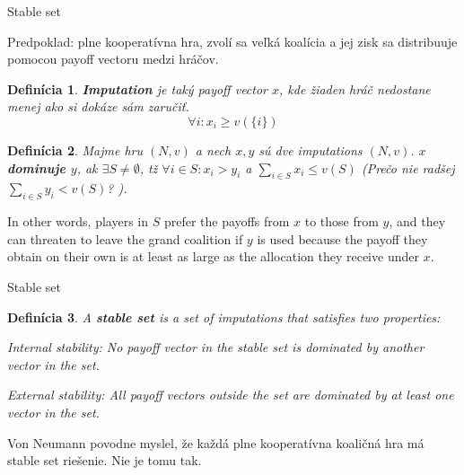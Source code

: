 \documentclass{beamer}
\newtheorem*{mydef}{Defin\'icia}
\begin{document}
\begin{frame}{Stable set}

Predpoklad: plne kooperat\'ivna hra, zvol\'i sa ve\v{l}k\'a koal\'icia a jej zisk sa distribuuje pomocou payoff vectoru medzi hr\'a\v{c}ov.
 
\begin{mydef}
{\bf Imputation} je tak\'y payoff vector $x$, kde \v{z}iaden hr\'a\v{c} nedostane menej ako si dok\'aze s\'am zaru\v{c}i\v{t}. 
\[ \forall i:x_{i} \geq v(\{i\})\]
\end{mydef}


\begin{mydef}
Majme hru $(N,v)$ a nech $x,y$ s\'u dve imputations $(N,v)$. {\bf $x$ dominuje $y$}, ak $\exists S \neq \emptyset$, t\v{z} $\forall i \in S :x_{i} > y_{i}$ a $\sum_{i \in S} x_{i} \leq v(S)$ (Pre\v{c}o nie rad\v{s}ej  $\sum_{i \in S} y_{i} < v(S)$? ).	
\end{mydef}

 In other words, players in $S$ prefer the payoffs from $x$ to those from $y$, and they can threaten to leave the grand coalition if $y$ is used because the payoff they obtain on their own is at least as large as the allocation they receive under $x$. 

\end{frame}



\begin{frame}{Stable set}

\begin{mydef}
A {\bf stable set} is a set of imputations that satisfies two properties:

Internal stability: No payoff vector in the stable set is dominated by another vector in the set.

External stability: All payoff vectors outside the set are dominated by at least one vector in the set.
\end{mydef}

Von Neumann povodne myslel, \v{z}e ka\v{z}d\'a plne kooperat\'ivna koali\v{c}n\'a hra m\'a stable set rie\v{s}enie. Nie je tomu tak.

\end{frame}
\end{document}
